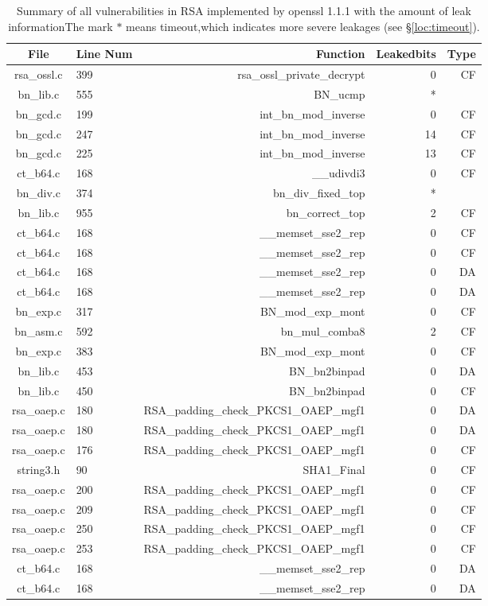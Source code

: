 \begin{table*}%
\centering
\caption{Summary of all vulnerabilities in RSA implemented by openssl 1.1.1 with the amount of leak informationThe mark $*$ means timeout,which indicates more severe leakages (see \S\ref{loc:timeout}).}\label{tab:RSAopenssl}
\begin{tabular}{clrrr}
\hline
\textbf{File} & \textbf{Line Num} & \textbf{Function} & \textbf{Leakedbits} & \textbf{Type} \\\hline
rsa\_ossl.c&399&rsa\_ossl\_private\_decrypt&0 &CF\\
bn\_lib.c&555&BN\_ucmp&*&\\
bn\_gcd.c&199&int\_bn\_mod\_inverse&0 &CF\\
bn\_gcd.c&247&int\_bn\_mod\_inverse&14&CF\\
bn\_gcd.c&225&int\_bn\_mod\_inverse&13&CF\\
ct\_b64.c&168&\_\_udivdi3&0 &CF\\
bn\_div.c&374&bn\_div\_fixed\_top&*&\\
bn\_lib.c&955&bn\_correct\_top&2 &CF\\
ct\_b64.c&168&\_\_memset\_sse2\_rep&0 &CF\\
ct\_b64.c&168&\_\_memset\_sse2\_rep&0 &CF\\
ct\_b64.c&168&\_\_memset\_sse2\_rep&0 &DA\\
ct\_b64.c&168&\_\_memset\_sse2\_rep&0 &DA\\
bn\_exp.c&317&BN\_mod\_exp\_mont&0 &CF\\
bn\_asm.c&592&bn\_mul\_comba8&2 &CF\\
bn\_exp.c&383&BN\_mod\_exp\_mont&0 &CF\\
bn\_lib.c&453&BN\_bn2binpad&0 &DA\\
bn\_lib.c&450&BN\_bn2binpad&0 &CF\\
rsa\_oaep.c&180&RSA\_padding\_check\_PKCS1\_OAEP\_mgf1&0 &DA\\
rsa\_oaep.c&180&RSA\_padding\_check\_PKCS1\_OAEP\_mgf1&0 &DA\\
rsa\_oaep.c&176&RSA\_padding\_check\_PKCS1\_OAEP\_mgf1&0 &CF\\
string3.h& 90&SHA1\_Final&0 &CF\\
rsa\_oaep.c&200&RSA\_padding\_check\_PKCS1\_OAEP\_mgf1&0 &CF\\
rsa\_oaep.c&209&RSA\_padding\_check\_PKCS1\_OAEP\_mgf1&0 &CF\\
rsa\_oaep.c&250&RSA\_padding\_check\_PKCS1\_OAEP\_mgf1&0 &CF\\
rsa\_oaep.c&253&RSA\_padding\_check\_PKCS1\_OAEP\_mgf1&0 &CF\\
ct\_b64.c&168&\_\_memset\_sse2\_rep&0 &DA\\
ct\_b64.c&168&\_\_memset\_sse2\_rep&0 &DA\\
\hline
\end{tabular}
\end{table*}